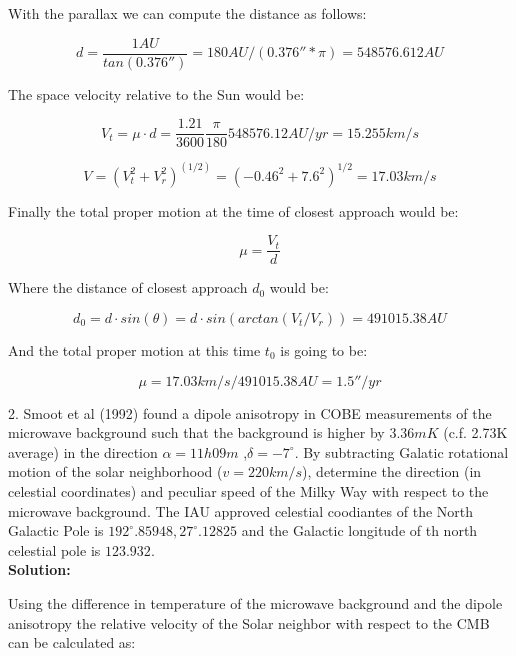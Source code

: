 \documentclass[14pt]{article}
\begin{document}
With the parallax we can compute the distance as follows:

\begin{equation}
d = \dfrac{1AU}{tan(0.376'')} = 180 AU /(0.376'' * \pi) = 548576.612 AU
\end{equation}

The space velocity relative to the Sun would be:

\begin{equation}
V_t = \mu \cdot d = \dfrac{1.21}{3600} \dfrac{\pi}{180} 548576.12 AU
/yr = 15.255 km/s
\end{equation}

\begin{equation}
V = (V_t^2 + V_r^2)^{(1/2)} = (-0.46^2 + 7.6^2)^{1/2} = 17.03 km/s
\end{equation}

Finally the total proper motion at the time of closest approach would
be:

\begin{equation}
\mu = \dfrac{V_t}{d}
\end{equation}

Where the distance of closest approach $d_0$ would be:

\begin{equation}
d_0 = d \cdot sin(\theta) = d \cdot sin(arctan(V_t/V_r)) =  491015.38
 AU
\end{equation}

And the total proper motion at this time $t_0$ is going to be:

\begin{equation}
\mu = 17.03 km/s / 491015.38 AU = 1.5''/yr
\end{equation}

2. Smoot et al (1992) found a dipole anisotropy in COBE measurements
of the microwave background such that the background is higher by
$3.36mK$ (c.f. 2.73K average) in the direction $\alpha=11h09m$
,$\delta=-7^{\circ}$. By subtracting Galatic rotational motion of
the solar neighborhood ($v=220km/s$), determine the direction (in
celestial coordinates) and peculiar speed of the Milky Way with
respect to the microwave background. The IAU approved celestial
coodiantes of the North Galactic Pole is $192^{\circ}.85948,
27^{\circ}.12825$ and the Galactic longitude of th north celestial pole
is $123.932$.\\

\textbf{Solution:}

Using the difference in temperature of the microwave background and
the dipole anisotropy the relative velocity of the Solar neighbor with 
respect to the CMB can be calculated as:
\end{document}
